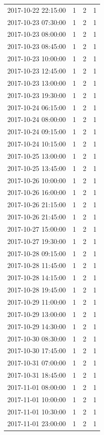 \begin{tabular}{lrrr}
2017-10-22 22:15:00 & 1 & 2 & 1 \\
2017-10-23 07:30:00 & 1 & 2 & 1 \\
2017-10-23 08:00:00 & 1 & 2 & 1 \\
2017-10-23 08:45:00 & 1 & 2 & 1 \\
2017-10-23 10:00:00 & 1 & 2 & 1 \\
2017-10-23 12:45:00 & 1 & 2 & 1 \\
2017-10-23 13:00:00 & 1 & 2 & 1 \\
2017-10-23 19:30:00 & 1 & 2 & 1 \\
2017-10-24 06:15:00 & 1 & 2 & 1 \\
2017-10-24 08:00:00 & 1 & 2 & 1 \\
2017-10-24 09:15:00 & 1 & 2 & 1 \\
2017-10-24 10:15:00 & 1 & 2 & 1 \\
2017-10-25 13:00:00 & 1 & 2 & 1 \\
2017-10-25 13:45:00 & 1 & 2 & 1 \\
2017-10-26 10:00:00 & 1 & 2 & 1 \\
2017-10-26 16:00:00 & 1 & 2 & 1 \\
2017-10-26 21:15:00 & 1 & 2 & 1 \\
2017-10-26 21:45:00 & 1 & 2 & 1 \\
2017-10-27 15:00:00 & 1 & 2 & 1 \\
2017-10-27 19:30:00 & 1 & 2 & 1 \\
2017-10-28 09:15:00 & 1 & 2 & 1 \\
2017-10-28 11:45:00 & 1 & 2 & 1 \\
2017-10-28 14:15:00 & 1 & 2 & 1 \\
2017-10-28 19:45:00 & 1 & 2 & 1 \\
2017-10-29 11:00:00 & 1 & 2 & 1 \\
2017-10-29 13:00:00 & 1 & 2 & 1 \\
2017-10-29 14:30:00 & 1 & 2 & 1 \\
2017-10-30 08:30:00 & 1 & 2 & 1 \\
2017-10-30 17:45:00 & 1 & 2 & 1 \\
2017-10-31 07:00:00 & 1 & 2 & 1 \\
2017-10-31 18:45:00 & 1 & 2 & 1 \\
2017-11-01 08:00:00 & 1 & 2 & 1 \\
2017-11-01 10:00:00 & 1 & 2 & 1 \\
2017-11-01 10:30:00 & 1 & 2 & 1 \\
2017-11-01 23:00:00 & 1 & 2 & 1 \\

\end{tabular}
